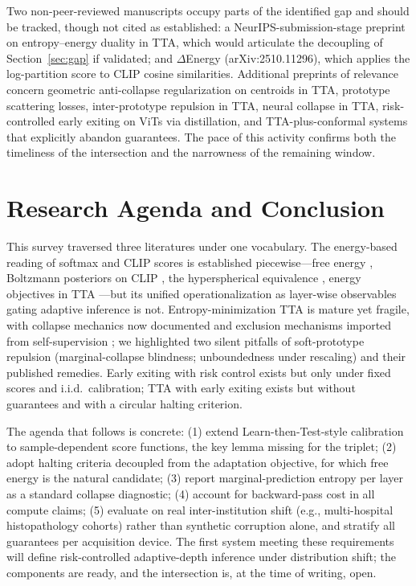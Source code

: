 \documentclass[preprint,12pt]{elsarticle}
\begin{document}
Two non-peer-reviewed manuscripts occupy parts of the identified gap and should be tracked, though not cited as established: a NeurIPS-submission-stage preprint on entropy--energy duality in TTA, which would articulate the decoupling of Section~\ref{sec:gap} if validated; and $\Delta$Energy (arXiv:2510.11296), which applies the log-partition score to CLIP cosine similarities. Additional preprints of relevance concern geometric anti-collapse regularization on centroids in TTA, prototype scattering losses, inter-prototype repulsion in TTA, neural collapse in TTA, risk-controlled early exiting on ViTs via distillation, and TTA-plus-conformal systems that explicitly abandon guarantees. The pace of this activity confirms both the timeliness of the intersection and the narrowness of the remaining window.

\section{Research Agenda and Conclusion}
\label{sec:conclusion}

This survey traversed three literatures under one vocabulary. The energy-based reading of softmax and CLIP scores is established piecewise---free energy \citep{liu2020energy,grathwohl2020jem}, Boltzmann posteriors on CLIP \citep{ming2022mcm}, the hyperspherical equivalence \citep{ming2023cider}, energy objectives in TTA \citep{yuan2024tea}---but its unified operationalization as layer-wise observables gating adaptive inference is not. Entropy-minimization TTA is mature yet fragile, with collapse mechanics now documented \citep{niu2023sar} and exclusion mechanisms imported from self-supervision \citep{bardes2022vicreg,caron2020swav}; we highlighted two silent pitfalls of soft-prototype repulsion (marginal-collapse blindness; unboundedness under rescaling) and their published remedies. Early exiting with risk control exists \citep{schuster2022calm,jazbec2024fast} but only under fixed scores and i.i.d.\ calibration; TTA with early exiting exists \citep{jia2024tinytta} but without guarantees and with a circular halting criterion.

The agenda that follows is concrete: (1) extend Learn-then-Test-style calibration to sample-dependent score functions, the key lemma missing for the triplet; (2) adopt halting criteria decoupled from the adaptation objective, for which free energy is the natural candidate; (3) report marginal-prediction entropy per layer as a standard collapse diagnostic; (4) account for backward-pass cost in all compute claims; (5) evaluate on real inter-institution shift (e.g., multi-hospital histopathology cohorts) rather than synthetic corruption alone, and stratify all guarantees per acquisition device. The first system meeting these requirements will define risk-controlled adaptive-depth inference under distribution shift; the components are ready, and the intersection is, at the time of writing, open.
\end{document}
